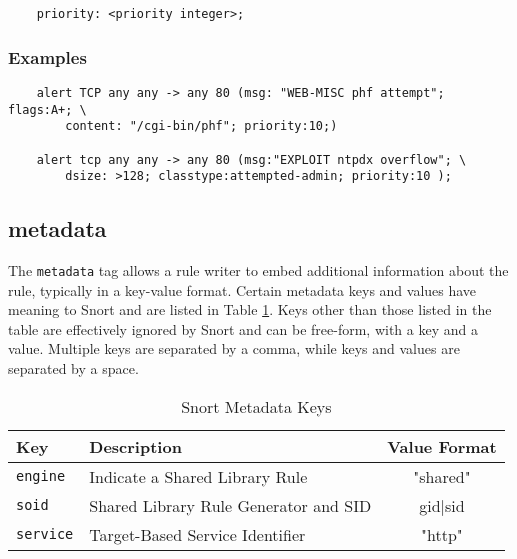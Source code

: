 \documentclass[english]{report}
\begin{document}
\begin{verbatim}
    priority: <priority integer>;
\end{verbatim}

\subsubsection{Examples}

\begin{verbatim}
    alert TCP any any -> any 80 (msg: "WEB-MISC phf attempt"; flags:A+; \
        content: "/cgi-bin/phf"; priority:10;)

    alert tcp any any -> any 80 (msg:"EXPLOIT ntpdx overflow"; \ 
        dsize: >128; classtype:attempted-admin; priority:10 );
\end{verbatim}

\subsection{metadata}

The \texttt{metadata} tag allows a rule writer to embed additional information
about the rule, typically in a key-value format.  Certain metadata keys and
values have meaning to Snort and are listed in Table \ref{Snort Metadata Keys}.
Keys other than those listed in the table are effectively ignored by Snort and
can be free-form, with a key and a value.  Multiple keys are separated by a
comma, while keys and values are separated by a space.

\begin{table}[h]
\begin{center}
\caption{Snort Metadata Keys}
\label{Snort Metadata Keys}
\begin{tabular}{|p{1in}|p{2.5in}|c|}

\hline 
Key & Description & Value Format \\
\hline

\hline
\texttt{engine} &
Indicate a Shared Library Rule & "shared" \\

\hline 
\texttt{soid} &
Shared Library Rule Generator and SID & gid$|$sid \\

\hline 
\texttt{service} &
Target-Based Service Identifier & "http" \\

\hline 
\end{tabular}
\end{center}
\end{table}
\end{document}
